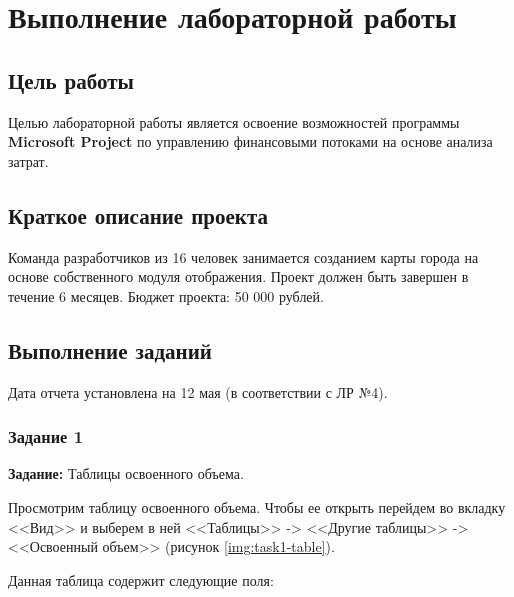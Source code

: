 \chapter{Выполнение лабораторной работы}


\section{Цель работы}

Целью лабораторной работы является освоение возможностей программы \textbf{Microsoft Project} по управлению финансовыми потоками на основе анализа затрат.


\section{Краткое описание проекта}

Команда разработчиков из 16 человек занимается созданием карты города на основе собственного модуля отображения. Проект должен быть завершен в течение 6 месяцев. Бюджет проекта: 50 000 рублей.


\section{Выполнение заданий}

Дата отчета установлена на 12 мая (в соответствии с ЛР №4).



\subsection{Задание 1}

\textbf{Задание:} Таблицы освоенного объема.

Просмотрим таблицу освоенного объема. Чтобы ее открыть перейдем во вкладку <<Вид>> и выберем в ней <<Таблицы>> -> <<Другие таблицы>> -> <<Освоенный объем>> (рисунок \ref{img:task1-table}).

Данная таблица содержит следующие поля:

